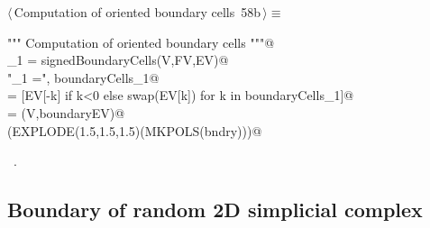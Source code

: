 \documentclass[11pt,oneside]{article}    %
\begin{document}
\begin{flushleft} \small \label{scrap111}
\protect{}$\langle\,$Computation of oriented boundary cells\nobreak\ {\footnotesize 58b}$\,\rangle\equiv$
\vspace{-1ex}
\begin{list}{}{} \item
\mbox{}\verb@"""  Computation of oriented boundary cells """@\\
\mbox{}\verb@boundaryCells_1 = signedBoundaryCells(V,FV,EV)@\\
\mbox{}\verb@print "\nboundaryCells_1 =\n", boundaryCells_1@\\
\mbox{}\verb@boundaryEV = [EV[-k] if k<0 else swap(EV[k]) for k in boundaryCells_1]@\\
\mbox{}\verb@bndry = (V,boundaryEV)@\\
\mbox{}\verb@VIEW(EXPLODE(1.5,1.5,1.5)(MKPOLS(bndry)))@\\
\mbox{}\verb@@{\NWsep}
\end{list}
\vspace{-1ex}
\footnotesize\addtolength{\baselineskip}{-1ex}
\begin{list}{}{\setlength{\itemsep}{-\parsep}\setlength{\itemindent}{-\leftmargin}}
\item \NWtxtMacroRefIn\ .
\end{list}
\end{flushleft}

\subsection{Boundary of random 2D simplicial complex}
\end{document}
